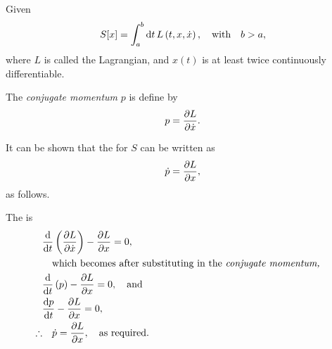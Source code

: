 Given
\[
	S[x] = \Int{a}{b}{t} L\lr{t, x, \dot{x}},\qtq{with} b>a,
\]
where $L$ is called the Lagrangian, and $x(t)$ is at least twice continuously differentiable.

The \textit{conjugate momentum} $p$ is define by
\begin{equation}
	\label{eq:5.1}
	p = \pderiv{L}{\dot{x}}.
\end{equation}

It can be shown that the \el for $S$ can be written as
\[
	\dot{p} = \pderiv{L}{x},
\]
as follows.

The \el is
\begin{align*}
	&\ELEd{L}{t}{x},\\
	&\qtq{which becomes after substituting in the \textit{conjugate momentum,}}\\
	&\deriv{}{t}\lr{p} - \pderiv{L}{x}=0,\qtq{and}\\
	&\deriv{p}{t}-\pderiv{L}{x}=0,\\
	\therefore&\quad \dot{p}=\pderiv{L}{x},\qtq{as required.}
\end{align*}


